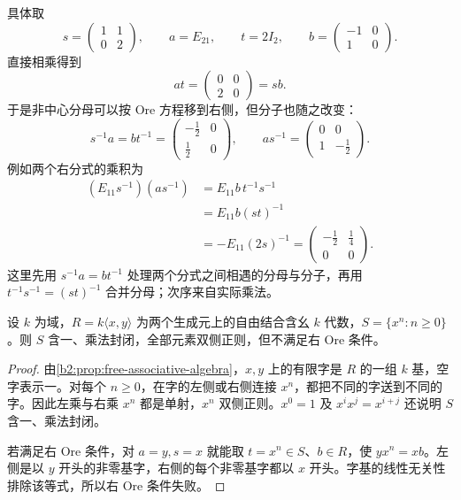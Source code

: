 \ProseParagraphBreak
具体取
\[
	s=\begin{pmatrix}1&1\\0&2\end{pmatrix},\qquad
	a=E_{21},\qquad t=2I_2,\qquad
	b=\begin{pmatrix}-1&0\\1&0\end{pmatrix}.
\]
直接相乘得到
\[
	at=\begin{pmatrix}0&0\\2&0\end{pmatrix}=sb.
\]
于是非中心分母可以按 Ore 方程移到右侧，但分子也随之改变：
\[
	s^{-1}a=bt^{-1}
	=\begin{pmatrix}-\frac12&0\\\frac12&0\end{pmatrix},
	\qquad
	as^{-1}=\begin{pmatrix}0&0\\1&-\frac12\end{pmatrix}.
\]
例如两个右分式的乘积为
\[
	\begin{aligned}
		(E_{11}s^{-1})(as^{-1}) &=E_{11}b\,t^{-1}s^{-1}\\
		&=E_{11}b(st)^{-1}\\
		&=-E_{11}(2s)^{-1}
		=\begin{pmatrix}-\frac12&\frac14\\0&0\end{pmatrix}.
	\end{aligned}
\]
这里先用 \(s^{-1}a=bt^{-1}\) 处理两个分式之间相遇的分母与分子，再用 \(t^{-1}s^{-1}=(st)^{-1}\) 合并分母；次序来自实际乘法。

\begin{proposition}\label{b2:prop:single-element-ore-obstruction}
	设 \(k\) 为域，\(R=k\langle x,y\rangle\) 为两个生成元上的自由结合含幺 \(k\) 代数，\(S=\{x^n:n\ge0\}\)。则 \(S\) 含一、乘法封闭，全部元素双侧正则，但不满足右 Ore 条件。
\end{proposition}
\begin{proof}
	由\cref{b2:prop:free-associative-algebra}，\(x,y\) 上的有限字是 \(R\) 的一组 \(k\) 基，空字表示一。对每个 \(n\ge0\)，在字的左侧或右侧连接 \(x^n\)，都把不同的字送到不同的字。因此左乘与右乘 \(x^n\) 都是单射，\(x^n\) 双侧正则。\(x^0=1\) 及 \(x^i x^j=x^{i+j}\) 还说明 \(S\) 含一、乘法封闭。

	若满足右 Ore 条件，对 \(a=y,s=x\) 就能取 \(t=x^n\in S\)、\(b\in R\)，使 \(yx^n=xb\)。左侧是以 \(y\) 开头的非零基字，右侧的每个非零基字都以 \(x\) 开头。字基的线性无关性排除该等式，所以右 Ore 条件失败。
\end{proof}

